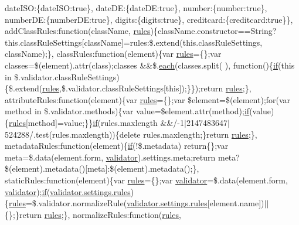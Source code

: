 \begin{DoxyCompactItemize}
date\+I\+S\+O\+:\{date\+I\+S\+O\+:true\}, date\+D\+E\+:\{date\+D\+E\+:true\}, number\+:\{number\+:true\}, number\+D\+E\+:\{number\+D\+E\+:true\}, digits\+:\{digits\+:true\}, creditcard\+:\{creditcard\+:true\}\}, add\+Class\+Rules\+:function(class\+Name, \hyperlink{_scripts_2respond_8js_ada87c2e257bc5ff6e77cdbc23ed986a3}{rules})\{class\+Name.\+constructor==String?this.\+class\+Rule\+Settings\mbox{[}class\+Name\mbox{]}=rules\+:\$.\+extend(this.\+class\+Rule\+Settings, class\+Name);\}, class\+Rules\+:function(element)\{var \hyperlink{_scripts_2respond_8js_ada87c2e257bc5ff6e77cdbc23ed986a3}{rules}=\{\};var classes=\$(element).attr(\textquotesingle{}class\textquotesingle{});classes \&\&\$.\hyperlink{_scripts_2jquery-1_810_82_8min_8js_af24c9ea1e34372f8c8b312b35586008d}{each}(classes.\+split(\textquotesingle{} \textquotesingle{}), function()\{\hyperlink{_scripts_2respond_8min_8js_a93851d60dd037a83509a1757b9ee7b66}{if}(this in \$.validator.\+class\+Rule\+Settings)\{\$.extend(\hyperlink{_scripts_2respond_8js_ada87c2e257bc5ff6e77cdbc23ed986a3}{rules},\$.validator.\+class\+Rule\+Settings\mbox{[}this\mbox{]});\}\});return \hyperlink{_scripts_2respond_8js_ada87c2e257bc5ff6e77cdbc23ed986a3}{rules};\}, attribute\+Rules\+:function(element)\{var \hyperlink{_scripts_2respond_8js_ada87c2e257bc5ff6e77cdbc23ed986a3}{rules}=\{\};var \$element=\$(element);for(var method in \$.validator.\+methods)\{var value=\$element.\+attr(method);\hyperlink{_scripts_2respond_8min_8js_a93851d60dd037a83509a1757b9ee7b66}{if}(value)\{\hyperlink{_scripts_2respond_8js_ada87c2e257bc5ff6e77cdbc23ed986a3}{rules}\mbox{[}method\mbox{]}=value;\}\}\hyperlink{_scripts_2respond_8min_8js_a93851d60dd037a83509a1757b9ee7b66}{if}(rules.\+maxlength \&\&/-\/1$\vert$2147483647$\vert$524288/.test(rules.\+maxlength))\{delete rules.\+maxlength;\}return \hyperlink{_scripts_2respond_8js_ada87c2e257bc5ff6e77cdbc23ed986a3}{rules};\}, metadata\+Rules\+:function(element)\{\hyperlink{_scripts_2respond_8min_8js_a93851d60dd037a83509a1757b9ee7b66}{if}(!\$.metadata) return\{\};var meta=\$.data(element.\+form, \textquotesingle{}\hyperlink{_scripts_2jquery_8validate_8js_a2dc8272bb221cdffcccbd20db038f172}{validator}\textquotesingle{}).settings.\+meta;return meta?\$(element).metadata()\mbox{[}meta\mbox{]}\+:\$(element).metadata();\}, static\+Rules\+:function(element)\{var \hyperlink{_scripts_2respond_8js_ada87c2e257bc5ff6e77cdbc23ed986a3}{rules}=\{\};var \hyperlink{_scripts_2jquery_8validate_8js_a2dc8272bb221cdffcccbd20db038f172}{validator}=\$.data(element.\+form, \textquotesingle{}\hyperlink{_scripts_2jquery_8validate_8js_a2dc8272bb221cdffcccbd20db038f172}{validator}\textquotesingle{});\hyperlink{_scripts_2respond_8min_8js_a93851d60dd037a83509a1757b9ee7b66}{if}(\hyperlink{_scripts_2respond_8js_ada87c2e257bc5ff6e77cdbc23ed986a3}{validator.\+settings.\+rules})\{\hyperlink{_scripts_2respond_8js_ada87c2e257bc5ff6e77cdbc23ed986a3}{rules}=\$.validator.\+normalize\+Rule(\hyperlink{_scripts_2respond_8js_ada87c2e257bc5ff6e77cdbc23ed986a3}{validator.\+settings.\+rules}\mbox{[}element.\+name\mbox{]})$\vert$$\vert$\{\};\}return \hyperlink{_scripts_2respond_8js_ada87c2e257bc5ff6e77cdbc23ed986a3}{rules};\}, normalize\+Rules\+:function(\hyperlink{_scripts_2respond_8js_ada87c2e257bc5ff6e77cdbc23ed986a3}{rules}, 
\end{DoxyCompactItemize}
